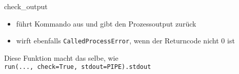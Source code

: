\begin{frame}[fragile]{check\_output}
	
	\begin{itemize}
		\item f\"uhrt Kommando aus und gibt den Prozessoutput zur\"uck
		\item wirft ebenfalls \texttt{CalledProcessError}, wenn der Returncode nicht 0 ist \\[.5cm]
	\end{itemize}
	Diese Funktion macht das selbe, wie \\
	\hspace*{1.5cm}\texttt{run(..., check=True, stdout=PIPE).stdout}
\end{frame}


